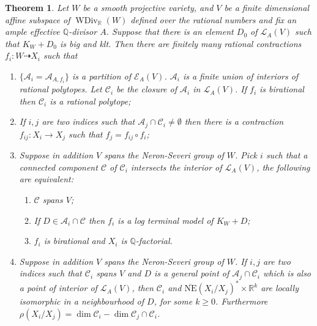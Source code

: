 \documentclass[11pt]{amsart}
\newtheorem{thm}[defn]{Theorem}
\begin{document}
\begin{thm}\label{mapbetweenAM}
  \cite[Theorem 3.3]{haconSarkisovProgram2012} Let $W$ be a smooth projective   variety, and  $ V $ be a finite dimensional affine subspace of $ \operatorname{WDiv}_{\mathbb{R}}(W) $ defined over the rational numbers and fix an ample effective $\mathbb{Q}$-divisor $A$. Suppose that there is an element $D_{0}$ of $\mathcal{L}_{A}(V)$ such that $K_{W}+D_{0}$ is big and klt. Then there are finitely many rational contractions $ f_i:W\dashrightarrow X_i $ such that
  \begin{enumerate}
    \item $ \{\mathcal{A}_i=\mathcal{A}_{A,f_i}\} $ is a partition of $ \mathcal{E}_{A}(V) $. $ \mathcal{A}_i $ is a finite union of interiors of rational polytopes.  Let $\mathcal{C}_{i}$ be the closure of $\mathcal{A}_{i}$ in $\mathcal{L}_{A}(V)$. If $ f_i $ is birational then $ \mathcal{C}_i$ is a rational polytope;
    \item If $ i,j $ are two indices such that $ \mathcal{A}_j\cap \mathcal{C}_i\neq \emptyset $ then there is a contraction $ f_{ij}:X_i\to X_j $ such that $ f_j=f_{ij}\circ f_i $;
    \item Suppose in addition $ V $ spans the Neron-Severi group of $W$. Pick $ i $ such that a connected component $ \mathcal{C} $ of $ \mathcal{C}_i $ intersects the interior of $ \mathcal{L}_A(V) $, the following are equivalent:
    \begin{enumerate} 
      \item $ \mathcal{C} $ spans $ V $;
      \item If $ D\in \mathcal{A}_i\cap \mathcal{C} $ then $ f_i $ is a log terminal model of $ K_W+D $;
      \item $ f_i $ is birational and $ X_i $ is $ \mathbb{Q} $-factorial.
    \end{enumerate}
    \item Suppose in addition $ V $ spans the Neron-Severi group of $W$. If $ i,j $ are two indices such that $ \mathcal{C}_i $ spans $ V $ and $ D $ is a general point of $ \mathcal{A}_j\cap \mathcal{C}_i $ which is also a point of interior of $ \mathcal{L}_A(V) $, then $ \mathcal{C}_i $ and $ \overline{\mathrm{NE}}(X_i/X_j)^*\times \mathbb{R}^k $ are locally isomorphic in a neighbourhood of $D$,  for some $ k\geqslant 0 $. Furthermore $ \rho(X_i/X_j)=\dim  \mathcal{C}_i-\dim \mathcal{C}_j\cap \mathcal{C}_i   $.
  \end{enumerate}
\end{thm}
\end{document}
